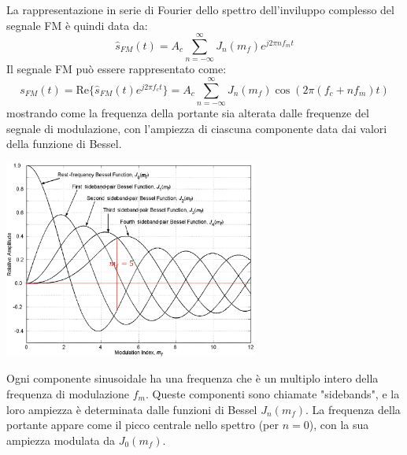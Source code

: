 La rappresentazione in serie di Fourier dello spettro dell'inviluppo complesso del segnale FM è quindi data da:
\[
    \hat{s}_{FM}(t) = A_c \sum_{n=-\infty}^{\infty} J_n(m_f) e^{j 2\pi n f_m t}
\]
Il segnale FM può essere rappresentato come:
\[
    s_{FM}(t) = \text{Re}\{ \hat{s}_{FM}(t) e^{j 2\pi f_c t} \} = A_c \sum_{n=-\infty}^{\infty} J_n(m_f) \cos(2\pi (f_c + n f_m) t)
\]
mostrando come la frequenza della portante sia alterata dalle frequenze del segnale di modulazione, con l'ampiezza di ciascuna componente data dai valori della funzione di Bessel.
\begin{center}
    \includegraphics[width=0.625\textwidth]{imgs/bessel1.png}
\end{center}

\begin{center}
\end{center}

Ogni componente sinusoidale ha una frequenza che è un multiplo intero della frequenza di modulazione \( f_m \).
Queste componenti sono chiamate "sidebands", e la loro ampiezza è determinata dalle funzioni di Bessel \( J_n(m_f) \).
La frequenza della portante appare come il picco centrale nello spettro (per \( n = 0 \)), con la sua ampiezza modulata da \( J_0(m_f) \).

